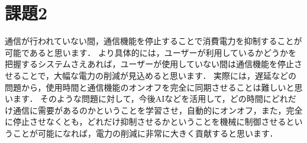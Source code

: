 \section*{課題2}
通信が行われていない間，通信機能を停止することで消費電力を抑制することが可能であると思います．
より具体的には，ユーザーが利用しているかどうかを把握するシステムさえあれば，ユーザーが使用していない間は通信機能を停止させることで，大幅な電力の削減が見込めると思います．
実際には，遅延などの問題から，使用時間と通信機能のオンオフを完全に同期させることは難しいと思います．
そのような問題に対して，今後AIなどを活用して，どの時間にどれだけ通信に需要があるのかということを学習させ，自動的にオンオフ，また，完全に停止させなくとも，どれだけ抑制させるかということを機械に制御させるということが可能になれば，電力の削減に非常に大きく貢献すると思います．
